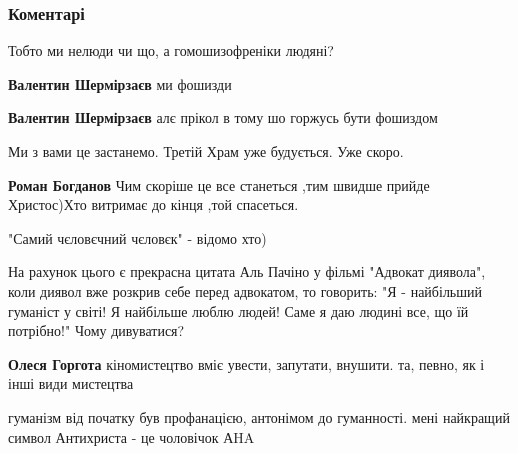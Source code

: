  
 
 
 
 
\subsubsection{Коментарі}
\label{sec:12_09_2021.fb.zagrebelnyj_igor.1.chelovechnost_gej_parad.cmt}

\begin{itemize} %
Тобто ми нелюди чи що, а гомошизофреніки людяні?

\begin{itemize} %
\textbf{Валентин Шермірзаєв} ми фошизди

\textbf{Валентин Шермірзаєв} алє прікол в тому шо горжусь бути фошиздом
\end{itemize} %

Ми з вами це застанемо.
Третій Храм уже будується.
Уже скоро.

\begin{itemize} %
\textbf{Роман Богданов} Чим скоріше це все станеться ,тим швидше прийде Христос)Хто витримає до кінця ,той спасеться.
\end{itemize} %

"Самий чєловєчний чєловєк" - відомо хто)

На рахунок цього є прекрасна цитата Аль Пачіно у фільмі "Адвокат диявола", коли диявол вже розкрив себе перед адвокатом, то говорить: "Я - найбільший гуманіст у світі! Я найбільше люблю людей! Саме я даю людині все, що їй потрібно!"
Чому дивуватися?

\begin{itemize} %
\textbf{Олеся Горгота} кіномистецтво вміє увести, запутати, внушити. та, певно, як і інші види мистецтва
\end{itemize} %


гуманізм від початку був профанацією, антонімом до гуманності. мені найкращий
символ Антихриста - це чоловічок АHA


\end{itemize}
